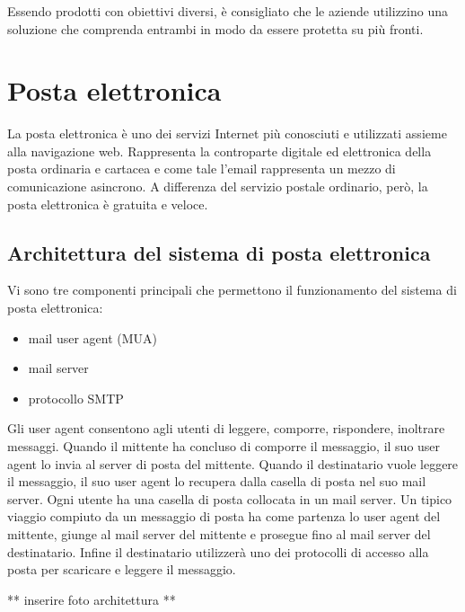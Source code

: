     \subsubsection*{}     
    Essendo prodotti con obiettivi diversi, è consigliato che le aziende utilizzino una soluzione che comprenda entrambi
    in modo da essere protetta su più fronti.


\pagebreak
\section{Posta elettronica}
La posta elettronica è uno dei servizi Internet più conosciuti e utilizzati assieme alla navigazione web. 
Rappresenta la controparte digitale ed elettronica della posta ordinaria e cartacea e come tale l’email 
rappresenta un mezzo di comunicazione asincrono. A differenza del servizio postale ordinario, però, 
la posta elettronica è gratuita e veloce.

\subsection{Architettura del sistema di posta elettronica}
Vi sono tre componenti principali che permettono il funzionamento del sistema di posta elettronica:
\begin{itemize}
    \item mail user agent (MUA)
    \item mail server
    \item protocollo SMTP
\end{itemize}
Gli user agent consentono agli utenti di leggere, comporre, rispondere, inoltrare messaggi. 
Quando il mittente ha concluso di comporre il messaggio, il suo user agent lo invia al server di posta del mittente. 
Quando il destinatario vuole leggere il messaggio, il suo user agent lo recupera dalla casella di posta nel suo mail server. 
Ogni utente ha una casella di posta collocata in un mail server.
Un tipico viaggio compiuto da un messaggio di posta ha come partenza lo user agent del mittente, 
giunge al mail server del mittente e prosegue fino al mail server del destinatario. 
Infine il destinatario utilizzerà uno dei protocolli di accesso alla posta per scaricare e leggere il messaggio.

** inserire foto architettura **

